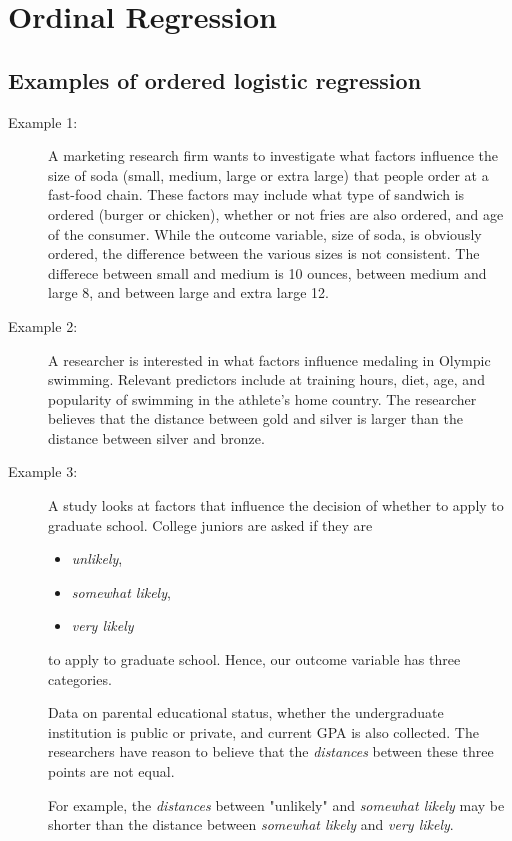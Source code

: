 \documentclass[]{article}
\begin{document}
\section*{Ordinal Regression}

\subsection*{Examples of ordered logistic regression}
\begin{description}
\item[Example 1:] A marketing research firm wants to investigate what factors influence the size of soda (small, medium, large or extra large) that people order at a fast-food chain. These factors may include what type of sandwich is ordered (burger or chicken), whether or not fries are also ordered, and age of the consumer. While the outcome variable, size of soda, is obviously ordered, the difference between the various sizes is not consistent. The differece between small and medium is 10 ounces, between medium and large 8, and between large and extra large 12.

\item[Example 2:] A researcher is interested in what factors influence medaling in Olympic swimming. Relevant predictors include at training hours, diet, age, and popularity of swimming in the athlete's home country. The researcher believes that the distance between gold and silver is larger than the distance between silver and bronze.

\item[Example 3:] A study looks at factors that influence the decision of whether to apply to graduate school. College juniors are asked if they are 
\begin{itemize}
\item \textit{unlikely}, 
\item \textit{somewhat likely}, 
\item \textit{very likely}
\end{itemize} to apply to graduate school. Hence, our outcome variable has three categories. 

\noindent Data on parental educational status, whether the undergraduate institution is public or private, and current GPA is also collected. The researchers have reason to believe that the \textit{distances} between these three points are not equal. 

\noindent For example, the \textit{distances} between "unlikely" and \textit{somewhat likely} may be shorter than the distance between \textit{somewhat likely} and \textit{very likely}.
\end{description}
\end{document}
